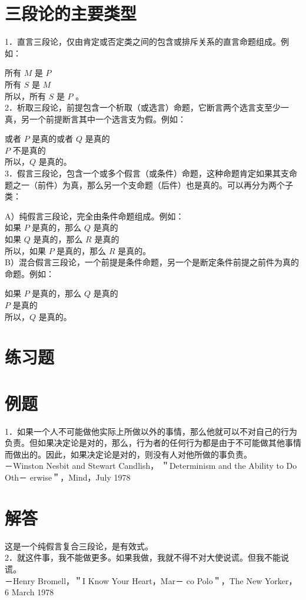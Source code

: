 \section*{三段论的主要类型}
1．直言三段论，仅由肯定或否定类之间的包含或排斥关系的直言命题组成。例如：

所有 $M$ 是 $P$\\
所有 $S$ 是 $M$\\
所以，所有 $S$ 是 $P$ 。\\
2．析取三段论，前提包含一个析取（或选言）命题，它断言两个选言支至少一真，另一个前提断言其中一个选言支为假。例如：

或者 $P$ 是真的或者 $Q$ 是真的\\
$P$ 不是真的\\
所以，$Q$ 是真的。\\
3．假言三段论，包含一个或多个假言（或条件）命题，这种命题肯定如果其支命题之一（前件）为真，那么另一个支命题（后件）也是真的。可以再分为两个子类：

A）纯假言三段论，完全由条件命题组成。例如：\\
如果 $P$ 是真的，那么 $Q$ 是真的\\
如果 $Q$ 是真的，那么 $R$ 是真的\\
所以，如果 $P$ 是真的，那么 $R$ 是真的。\\
B）混合假言三段论，一个前提是条件命题，另一个是断定条件前提之前件为真的命题。例如：

如果 $P$ 是真的，那么 $Q$ 是真的\\
$P$ 是真的\\
所以，$Q$ 是真的。

\section*{练习题}
\section*{例题}
1．如果一个人不可能做他实际上所做以外的事情，那么他就可以不对自己的行为负责。但如果决定论是对的，那么，行为者的任何行为都是由于不可能做其他事情而做出的。因此，如果决定论是对的，则没有人对他所做的事负责。\\
－Winston Nesbit and Stewart Candlish， ＂Determinism and the Ability to Do Oth－ erwise＂，Mind，July 1978

\section*{解答}
这是一个纯假言复合三段论，是有效式。\\
2．就这件事，我不能做更多。如果我做，我就不得不对大使说谎。但我不能说谎。\\
－Henry Bromell，＂I Know Your Heart，Mar－ co Polo＂，The New Yorker， 6 March 1978


